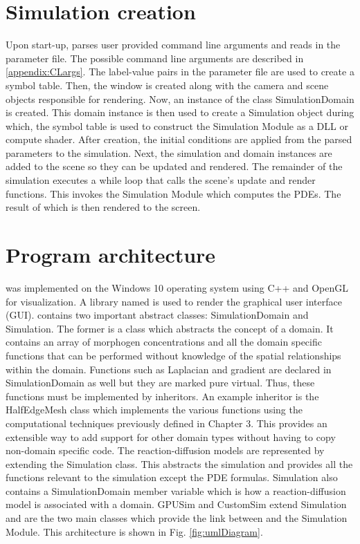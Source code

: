 \section{Simulation creation}
Upon start-up, \ProgramName{} parses user provided command line arguments and reads in the parameter file. The possible command line arguments are described in \ref{appendix:CLargs}. The label-value pairs in the parameter file are used to create a symbol table. Then, the window is created along with the camera and scene objects responsible for rendering. Now, an instance of the class SimulationDomain is created. This domain instance is then used to create a Simulation object during which, the symbol table is used to construct the Simulation Module as a DLL or compute shader. After creation, the initial conditions are applied from the parsed parameters to the simulation. Next, the simulation and domain instances are added to the scene so they can be updated and rendered. The remainder of the simulation executes a while loop that calls the scene's update and render functions. This invokes the Simulation Module which computes the PDEs. The result of which is then rendered to the screen.


\section{Program architecture} 
\ProgramName{} was implemented on the Windows 10 operating system using C++ and OpenGL for visualization. A library named  \citep{Cornut2019} is used to render the graphical user interface (GUI). \ProgramName{} contains two important abstract classes: SimulationDomain and Simulation. The former is a class which abstracts the concept of a domain. It contains an array of morphogen concentrations and all the domain specific functions that can be performed without knowledge of the spatial relationships within the domain. Functions such as Laplacian and gradient are declared in SimulationDomain as well but they are marked pure virtual. Thus, these functions must be implemented by inheritors. An example inheritor is the HalfEdgeMesh class which implements the various functions using the computational techniques previously defined in Chapter 3. This provides an extensible way to add support for other domain types without having to copy non-domain specific code. The reaction-diffusion models are represented by extending the Simulation class. This abstracts the simulation and provides all the functions relevant to the simulation except the PDE formulas. Simulation also contains a SimulationDomain member variable which is how a reaction-diffusion model is associated with a domain. GPUSim and CustomSim extend Simulation and are the two main classes which provide the link between \ProgramName{} and the Simulation Module. This architecture is shown in Fig. \ref{fig:umlDiagram}.

